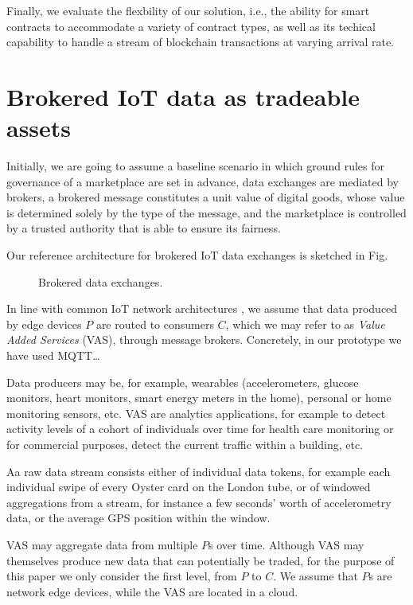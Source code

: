 \documentclass[conference]{IEEEtran}
\begin{document}
Finally, we evaluate the flexbility of our solution, i.e., the ability for smart contracts to accommodate a variety of contract types, as well as its techical capability to handle a stream of blockchain transactions at varying arrival rate.

\section{Brokered IoT data as tradeable assets}

Initially, we are going to assume a baseline scenario in which ground rules for governance of a marketplace are set in advance, data exchanges are mediated by brokers, a brokered message constitutes a unit value of digital goods, whose value is determined solely by the type of the message, and the marketplace is controlled by a trusted authority that is able to ensure its fairness.

Our reference architecture for brokered IoT data exchanges is sketched in Fig. 

\begin{figure}
\caption{Brokered data exchanges.}
\label{fig:BDE}
\end{figure}

In line with common IoT network architectures , we assume that data produced by edge devices $ P $ are routed to consumers $ C $, which we may refer to as \textit{Value Added Services} (VAS), through message brokers. Concretely, in our prototype we have used MQTT… 

Data producers may be, for example, wearables (accelerometers, glucose monitors, heart monitors, smart energy meters in the home), personal or home monitoring sensors, etc.
VAS are analytics applications, for example to detect activity levels of a cohort of individuals over time for health care monitoring or for commercial purposes, detect the current traffic within a building, etc.

Aa raw data stream consists either of individual data tokens, for example each individual swipe of every Oyster card on the London tube, or of windowed aggregations from a stream, for instance a few seconds’ worth of accelerometry data, or the average GPS position within the window.

VAS may aggregate data from multiple $ P $s over time. Although VAS may themselves produce new data that can potentially be traded, for the purpose of this paper we only consider the first level, from $ P $ to $ C $. We assume that $ P $s are network edge devices, while the VAS are located in a cloud.
\end{document}

